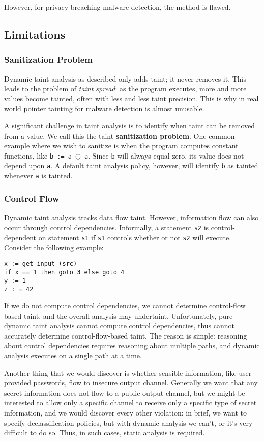 However, for privacy-breaching malware detection, the method is flawed.

\subsection{Limitations}
\subsubsection{Sanitization Problem}
Dynamic taint analysis as described only adds taint; it never removes it. This leads to the problem of \textit{taint spread}: as the program executes, more and more values become tainted, often with less and less taint precision. This is why in real world pointer tainting for malware detection is almost unusable.

A significant challenge in taint analysis is to identify when taint can be removed from a value. We call this the taint \textbf{sanitization problem}. One common example where we wish to sanitize is when the program computes constant functions, like \texttt{b := a $\oplus$ a}. Since \texttt{b} will always equal zero, its value does not depend upon \texttt{a}. A default taint analysis policy, however, will identify \texttt{b} as tainted whenever \texttt{a} is tainted.

\subsubsection{Control Flow}
Dynamic taint analysis tracks data flow taint. However, information flow can also occur through control dependencies. Informally, a statement \texttt{s2} is control-dependent on statement \texttt{s1} if \texttt{s1} controls whether or not \texttt{s2} will execute. Consider the following example:

\begin{lstlisting}
x := get_input (src)
if x == 1 then goto 3 else goto 4
y := 1
z : = 42
\end{lstlisting}

If we do not compute control dependencies, we cannot determine control-flow based taint, and the overall analysis may undertaint. Unfortunately, pure dynamic taint analysis cannot compute control dependencies, thus cannot accurately determine control-flow-based taint. The reason is simple: reasoning about control dependencies requires reasoning about multiple paths, and dynamic analysis executes on a single path at a time.

Another thing that we would discover is whether sensible information, like user-provided passwords, flow to insecure output channel. Generally we want that any secret information does not flow to a public output channel, but we might be interested to allow only a specific channel to receive only a specific type of secret information, and we would discover every other violation: in brief, we want to specify declassification policies, but with dynamic analysis we can't, or it's very difficult to do so. Thus, in such cases, static analysis is required.